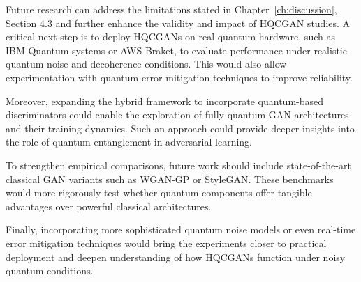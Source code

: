 Future research can address the limitations stated in Chapter~\ref{ch:discussion}, Section 4.3 and further enhance the validity and impact of HQCGAN studies. A critical next step is to deploy HQCGANs on real quantum hardware, such as IBM Quantum systems or AWS Braket, to evaluate performance under realistic quantum noise and decoherence conditions. This would also allow experimentation with quantum error mitigation techniques to improve reliability.

Moreover, expanding the hybrid framework to incorporate quantum-based discriminators could enable the exploration of fully quantum GAN architectures and their training dynamics. Such an approach could provide deeper insights into the role of quantum entanglement in adversarial learning.

To strengthen empirical comparisons, future work should include state-of-the-art classical GAN variants such as WGAN-GP or StyleGAN. These benchmarks would more rigorously test whether quantum components offer tangible advantages over powerful classical architectures.

Finally, incorporating more sophisticated quantum noise models or even real-time error mitigation techniques would bring the experiments closer to practical deployment and deepen understanding of how HQCGANs function under noisy quantum conditions.